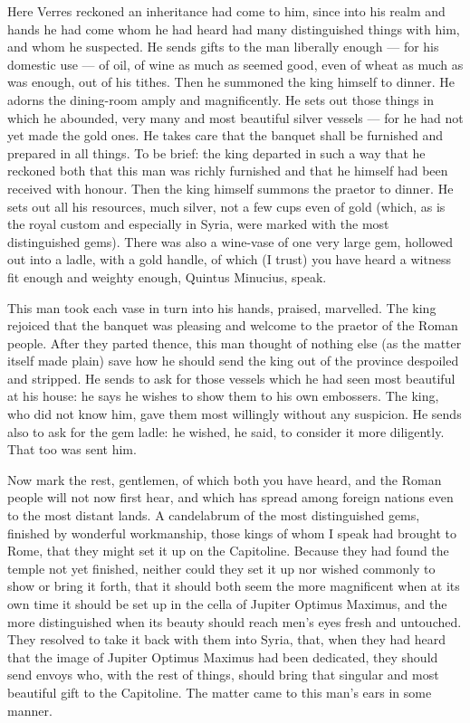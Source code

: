  Here Verres reckoned an inheritance had come to him, since into his realm and hands he had come whom he had heard had many distinguished things with him, and whom he suspected. He sends gifts to the man liberally enough --- for his domestic use --- of oil, of wine as much as seemed good, even of wheat as much as was enough, out of his tithes. Then he summoned the king himself to dinner. He adorns the dining-room amply and magnificently. He sets out those things in which he abounded, very many and most beautiful silver vessels --- for he had not yet made the gold ones. He takes care that the banquet shall be furnished and prepared in all things. To be brief: the king departed in such a way that he reckoned both that this man was richly furnished and that he himself had been received with honour. Then the king himself summons the praetor to dinner. He sets out all his resources, much silver, not a few cups even of gold (which, as is the royal custom and especially in Syria, were marked with the most distinguished gems). There was also a wine-vase of one very large gem, hollowed out into a ladle, with a gold handle, of which (I trust) you have heard a witness fit enough and weighty enough, Quintus Minucius, speak.

 This man took each vase in turn into his hands, praised, marvelled. The king rejoiced that the banquet was pleasing and welcome to the praetor of the Roman people. After they parted thence, this man thought of nothing else (as the matter itself made plain) save how he should send the king out of the province despoiled and stripped. He sends to ask for those vessels which he had seen most beautiful at his house: he says he wishes to show them to his own embossers. The king, who did not know him, gave them most willingly without any suspicion. He sends also to ask for the gem ladle: he wished, he said, to consider it more diligently. That too was sent him.

 Now mark the rest, gentlemen, of which both you have heard, and the Roman people will not now first hear, and which has spread among foreign nations even to the most distant lands. A candelabrum of the most distinguished gems, finished by wonderful workmanship, those kings of whom I speak had brought to Rome, that they might set it up on the Capitoline. Because they had found the temple not yet finished, neither could they set it up nor wished commonly to show or bring it forth, that it should both seem the more magnificent when at its own time it should be set up in the cella of Jupiter Optimus Maximus, and the more distinguished when its beauty should reach men's eyes fresh and untouched. They resolved to take it back with them into Syria, that, when they had heard that the image of Jupiter Optimus Maximus had been dedicated, they should send envoys who, with the rest of things, should bring that singular and most beautiful gift to the Capitoline. The matter came to this man's ears in some manner.

